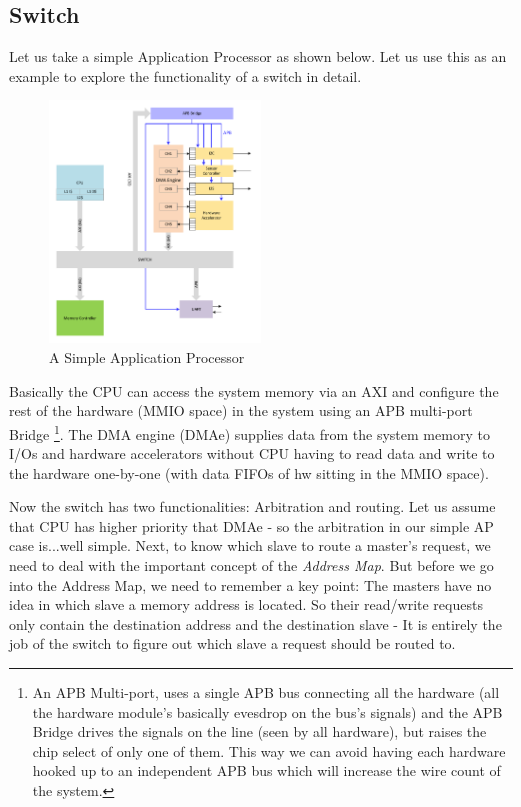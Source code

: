 \subsection{Switch}
Let us take a simple Application Processor as shown below. Let us use this as an example to explore the functionality of a switch in detail. 
	\begin{figure}[h]
		\centering
		\includegraphics[width = 0.5\textwidth]{partSys/SimplestAP}
		\caption{A Simple Application Processor}
		\label{fig:simpleAP}
	\end{figure}

Basically the CPU can access the system memory via an AXI and configure the rest of the hardware (MMIO space) in the system using an APB multi-port Bridge \footnote{An APB Multi-port, uses a single APB bus connecting all the hardware (all the hardware module's basically evesdrop on the bus's signals) and the APB Bridge drives the signals on the line (seen by all hardware), but raises the chip select of only one of them. This way we can avoid having each hardware hooked up to an independent APB bus which will increase the wire count of the system.}.  The DMA engine (DMAe) supplies data from the system memory to I/Os and hardware accelerators without CPU having to read data and write to the hardware one-by-one (with data FIFOs of hw sitting in the MMIO space). 

Now the switch has two functionalities: Arbitration and routing. Let us assume that CPU has higher priority that DMAe - so the arbitration in our simple AP case is...well simple. Next, to know which slave to route a master's request, we need to deal with the important concept of the \emph{Address Map}. But before we go into the Address Map, we need to remember a key point: The masters have no idea in which slave a memory address is located. So their read/write requests only contain the destination address and the destination slave - It is entirely the job of the switch to figure out which slave a request should be routed to.

